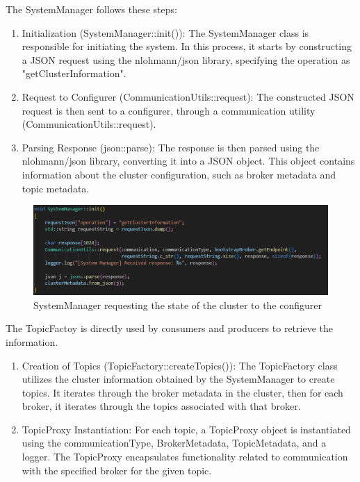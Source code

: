The SystemManager follows these steps:

\begin{enumerate}
    \item   Initialization (SystemManager::init()): The SystemManager class is
        responsible for initiating the system. In this process, it starts by
        constructing a JSON request using the nlohmann/json library,
        specifying the operation as "getClusterInformation".
    \item Request to Configurer (CommunicationUtils::request): The constructed
        JSON request is then sent to a configurer, through a communication
        utility (CommunicationUtils::request).
    \item Parsing Response (json::parse): The response is then parsed using the
        nlohmann/json library, converting it into a JSON object. This object
        contains information about the cluster configuration, such as broker
        metadata and topic metadata.
\end{enumerate}

\begin{figure}[H]
    \centering
    \includegraphics[width=1.0\textwidth]{Figures/implementation_system_manager.png}
    \caption{SystemManager requesting the state of the cluster to the configurer}
\end{figure}

The TopicFactoy is directly used by consumers and producers to retrieve the
information.

\begin{enumerate}
    \item   Creation of Topics (TopicFactory::createTopics()): The TopicFactory
        class utilizes the cluster information obtained by the SystemManager to
        create topics. It iterates through the broker metadata in the cluster,
        then for each broker, it iterates through the topics
        associated with that broker.
    \item   TopicProxy Instantiation: For each topic, a TopicProxy object is
        instantiated using the communicationType, BrokerMetadata,
        TopicMetadata, and a logger. The TopicProxy encapsulates functionality
        related to communication with the specified broker for the given topic.
\end{enumerate}

